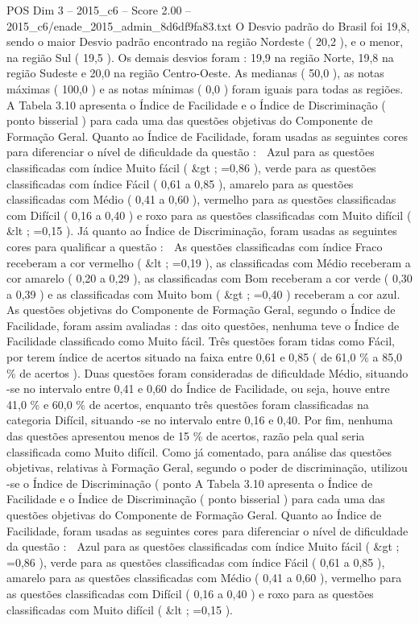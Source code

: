 \begin{textsample}{POS Dim 3 – 2015\_c6 – Score 2.00 – 2015\_c6/enade\_2015\_admin\_8d6df9fa83.txt}
O Desvio padrão do Brasil foi 19,8, sendo o maior Desvio padrão encontrado na região Nordeste ( 20,2 ), e o menor, na região Sul ( 19,5 ).
Os demais desvios foram : 19,9 na região Norte, 19,8 na região Sudeste e 20,0 na região Centro-Oeste.
As medianas ( 50,0 ), as notas máximas ( 100,0 ) e as notas mínimas ( 0,0 ) foram iguais para todas as regiões.
A Tabela 3.10 apresenta o Índice de Facilidade e o Índice de Discriminação ( ponto bisserial ) para cada uma das questões objetivas do Componente de Formação Geral.
Quanto ao Índice de Facilidade, foram usadas as seguintes cores para diferenciar o nível de dificuldade da questão :  Azul para as questões classificadas com índice Muito fácil ( \&gt ; =0,86 ), verde para as questões classificadas com índice Fácil ( 0,61 a 0,85 ), amarelo para as questões classificadas com Médio ( 0,41 a 0,60 ), vermelho para as questões classificadas com Difícil ( 0,16 a 0,40 ) e roxo para as questões classificadas com Muito difícil ( \&lt ; =0,15 ).
Já quanto ao Índice de Discriminação, foram usadas as seguintes cores para qualificar a questão :  As questões classificadas com índice Fraco receberam a cor vermelho ( \&lt ; =0,19 ), as classificadas com Médio receberam a cor amarelo ( 0,20 a 0,29 ), as classificadas com Bom receberam a cor verde ( 0,30 a 0,39 ) e as classificadas com Muito bom ( \&gt ; =0,40 ) receberam a cor azul.
As questões objetivas do Componente de Formação Geral, segundo o Índice de Facilidade, foram assim avaliadas : das oito questões, nenhuma teve o Índice de Facilidade classificado como Muito fácil.
Três questões foram tidas como Fácil, por terem índice de acertos situado na faixa entre 0,61 e 0,85 ( de 61,0 \% a 85,0 \% de acertos ).
Duas questões foram consideradas de dificuldade Médio, situando -se no intervalo entre 0,41 e 0,60 do Índice de Facilidade, ou seja, houve entre 41,0 \% e 60,0 \% de acertos, enquanto três questões foram classificadas na categoria Difícil, situando -se no intervalo entre 0,16 e 0,40.
Por fim, nenhuma das questões apresentou menos de 15 \% de acertos, razão pela qual seria classificada como Muito difícil.
Como já comentado, para análise das questões objetivas, relativas à Formação Geral, segundo o poder de discriminação, utilizou -se o Índice de Discriminação ( ponto A Tabela 3.10 apresenta o Índice de Facilidade e o Índice de Discriminação ( ponto bisserial ) para cada uma das questões objetivas do Componente de Formação Geral.
Quanto ao Índice de Facilidade, foram usadas as seguintes cores para diferenciar o nível de dificuldade da questão :  Azul para as questões classificadas com índice Muito fácil ( \&gt ; =0,86 ), verde para as questões classificadas com índice Fácil ( 0,61 a 0,85 ), amarelo para as questões classificadas com Médio ( 0,41 a 0,60 ), vermelho para as questões classificadas com Difícil ( 0,16 a 0,40 ) e roxo para as questões classificadas com Muito difícil ( \&lt ; =0,15 ).

\end{textsample}
